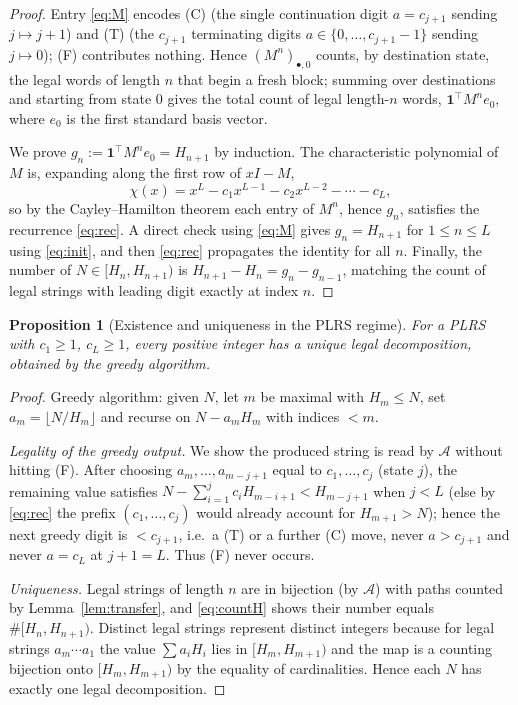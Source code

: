 \documentclass[12pt]{article}
\newtheorem{proposition}{Proposition}
\theoremstyle{definition}
\begin{document}
\begin{proof}
Entry \eqref{eq:M} encodes (C) (the single continuation digit $a=c_{j+1}$
sending $j\mapsto j+1$) and (T) (the $c_{j+1}$ terminating digits
$a\in\{0,\dots,c_{j+1}-1\}$ sending $j\mapsto 0$); (F) contributes nothing.
Hence $(M^n)_{\bullet,0}$ counts, by destination state, the legal words of
length $n$ that begin a fresh block; summing over destinations and starting from
state $0$ gives the total count of legal length-$n$ words,
$\mathbf 1^{\!\top}M^{n}e_0$, where $e_0$ is the first standard basis vector.

We prove $g_n:=\mathbf 1^{\!\top}M^{n}e_0=H_{n+1}$ by induction. The
characteristic polynomial of $M$ is, expanding along the first row of
$xI-M$,
\begin{equation}\label{eq:char}
\chi(x)=x^{L}-c_1x^{L-1}-c_2x^{L-2}-\cdots-c_L ,
\end{equation}
so by the Cayley--Hamilton theorem each entry of $M^n$, hence $g_n$, satisfies
the recurrence \eqref{eq:rec}. A direct check using \eqref{eq:M} gives
$g_n=H_{n+1}$ for $1\le n\le L$ using \eqref{eq:init}, and then \eqref{eq:rec}
propagates the identity for all $n$. Finally, the number of $N\in[H_n,H_{n+1})$
is $H_{n+1}-H_n=g_n-g_{n-1}$, matching the count of legal strings with leading
digit exactly at index $n$.
\end{proof}

\begin{proposition}[Existence and uniqueness in the PLRS regime]\label{prop:eu}
For a PLRS with $c_1\ge1$, $c_L\ge1$, every positive integer has a unique legal
decomposition, obtained by the greedy algorithm.
\end{proposition}

\begin{proof}
Greedy algorithm: given $N$, let $m$ be maximal with $H_m\le N$, set
$a_m=\lfloor N/H_m\rfloor$ and recurse on $N-a_mH_m$ with indices $<m$.

\emph{Legality of the greedy output.} We show the produced string is read by
$\mathcal A$ without hitting (F). After choosing $a_m,\dots,a_{m-j+1}$ equal to
$c_1,\dots,c_j$ (state $j$), the remaining value satisfies
$N-\sum_{i=1}^{j}c_iH_{m-i+1}<H_{m-j+1}$ when $j<L$ (else by \eqref{eq:rec} the
prefix $(c_1,\dots,c_{j})$ would already account for $H_{m+1}>N$); hence the next
greedy digit is $<c_{j+1}$, i.e.\ a (T) or a further (C) move, never $a>c_{j+1}$
and never $a=c_L$ at $j+1=L$. Thus (F) never occurs.

\emph{Uniqueness.} Legal strings of length $n$ are in bijection (by
$\mathcal A$) with paths counted by Lemma~\ref{lem:transfer}, and
\eqref{eq:countH} shows their number equals $\#[H_n,H_{n+1})$. Distinct legal
strings represent distinct integers because for legal strings
$a_m\cdots a_1$ the value $\sum a_iH_i$ lies in $[H_m,H_{m+1})$ and the map is a
counting bijection onto $[H_m,H_{m+1})$ by the equality of cardinalities. Hence
each $N$ has exactly one legal decomposition.
\end{proof}
\end{document}
